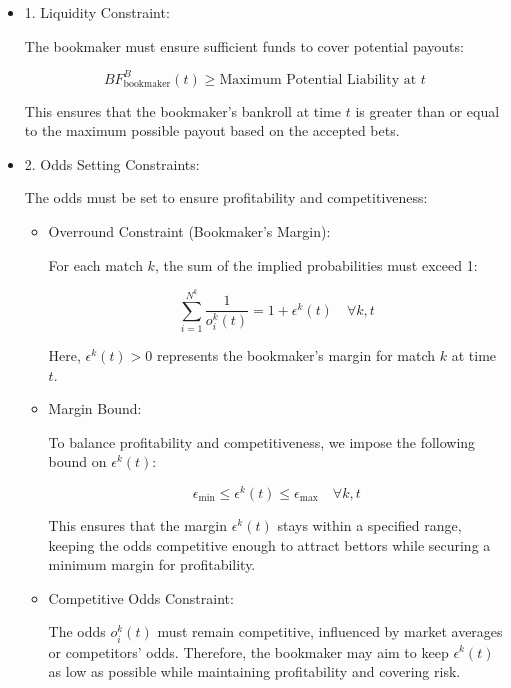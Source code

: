\begin{itemize}
    \item 1. Liquidity Constraint:
    
       The bookmaker must ensure sufficient funds to cover potential payouts:
    
       \[
       BF_{\text{bookmaker}}^B(t) \geq \text{Maximum Potential Liability at } t
       \]
    
       This ensures that the bookmaker's bankroll at time \( t \) is greater than or equal to the maximum possible payout based on the accepted bets.
    
    \item 2. Odds Setting Constraints:
    
       The odds must be set to ensure profitability and competitiveness:
    
       \begin{itemize}
          \item Overround Constraint (Bookmaker's Margin):
    
            For each match \( k \), the sum of the implied probabilities must exceed 1:
    
            \[
            \sum_{i=1}^{N^k} \frac{1}{o_i^k(t)} = 1 + \epsilon^k(t) \quad \forall k, t
            \]
    
            Here, \( \epsilon^k(t) > 0 \) represents the bookmaker's margin for match \( k \) at time \( t \).
    
          \item Margin Bound:
    
            To balance profitability and competitiveness, we impose the following bound on \( \epsilon^k(t) \):
    
            \[
            \epsilon_{\text{min}} \leq \epsilon^k(t) \leq \epsilon_{\text{max}} \quad \forall k, t
            \]
    
            This ensures that the margin \( \epsilon^k(t) \) stays within a specified range, keeping the odds competitive enough to attract bettors while securing a minimum margin for profitability.
          
          \item Competitive Odds Constraint:
    
            The odds \( o_i^k(t) \) must remain competitive, influenced by market averages or competitors' odds. Therefore, the bookmaker may aim to keep \( \epsilon^k(t) \) as low as possible while maintaining profitability and covering risk.
       \end{itemize}
\end{itemize}


